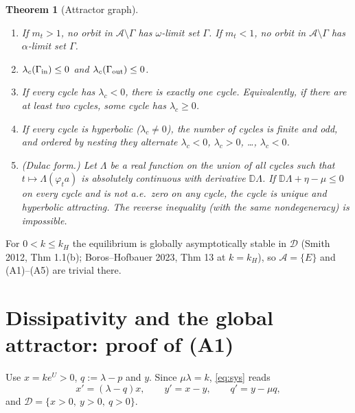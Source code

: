 \documentclass[11pt,a4paper]{article}
\numberwithin{equation}{section}
\newtheorem{theorem}{Theorem}[section]
\theoremstyle{remark}\newtheorem{remark}[theorem]{Remark}
\newcommand{\cA}{\mathcal A}
\newcommand{\cD}{\mathcal D}
\DeclareMathOperator{\diver}{div}
\begin{document}
\begin{theorem}[Attractor graph]
\begin{enumerate}[label=\textup{(A\arabic*)},resume]
\begin{enumerate}[label=\textup{(\alph*)}]
of the $C^1$ planar field $F$ and its planar Floquet multiplier $\exp\oint\diver F\,dt$ equals $m_t$. For
$\Gamma_{\rm out}$ the same holds for the $C^1$ field $\widehat F=(v,k-\mu v-\widehat h)$, where $\widehat h$ is any
Whitney extension of the jet $(h,g)$; $\widehat F=F$ on $D$.
\item If $m_t>1$, no orbit in $\cA\setminus\Gamma$ has $\omega$-limit set $\Gamma$. If $m_t<1$, no orbit in
$\cA\setminus\Gamma$ has $\alpha$-limit set $\Gamma$.
\item $\lambda_c(\Gamma_{\rm in})\le0$ and $\lambda_c(\Gamma_{\rm out})\le0$.
\item If every cycle has $\lambda_c<0$, there is exactly one cycle. Equivalently, if there are at least two cycles,
some cycle has $\lambda_c\ge0$.
\item If every cycle is hyperbolic ($\lambda_c\neq0$), the number of cycles is finite and odd, and ordered by
nesting they alternate $\lambda_c<0$, $\lambda_c>0$, \dots, $\lambda_c<0$.
\item \textup{(Dulac form.)} Let $\Lambda$ be a real function on the union of all cycles such that
$t\mapsto\Lambda(\varphi_ta)$ is absolutely continuous with derivative $\mathbb D\Lambda$. If
$\mathbb D\Lambda+\eta-\mu\le0$ on every cycle and is not a.e.\ zero on any cycle, the cycle is unique and
hyperbolic attracting. The reverse inequality (with the same nondegeneracy) is impossible.
\end{enumerate}
\end{enumerate}
\end{theorem}
For $0<k\le k_H$ the equilibrium is globally asymptotically stable in $\cD$ (Smith 2012, Thm 1.1(b); Boros--Hofbauer
2023, Thm 13 at $k=k_H$), so $\cA=\{E\}$ and (A1)--(A5) are trivial there.

\section{Dissipativity and the global attractor: proof of (A1)}\label{sec:diss}
Use $x=ke^{U}>0$, $q:=\lambda-p$ and $y$. Since $\mu\lambda=k$, \eqref{eq:sys} reads
\begin{equation}\label{eq:xyq}
x'=(\lambda-q)x,\qquad y'=x-y,\qquad q'=y-\mu q,
\end{equation}
and $\cD=\{x>0,\ y>0,\ q>0\}$.
\end{document}

